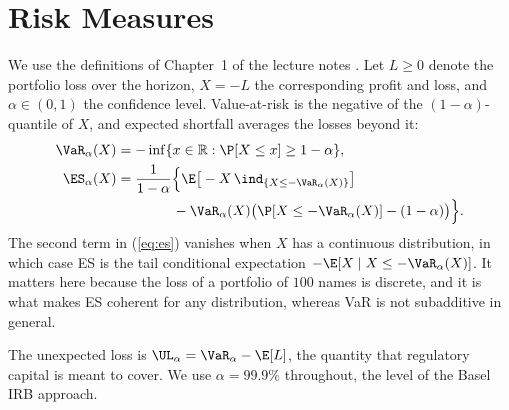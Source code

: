 \section{Risk Measures}
\label{sec:riskmeasures}

We use the definitions of Chapter~1 of the lecture notes \citep{DeGiorgi26}. Let $L\ge0$ denote the portfolio loss over the horizon, $X=-L$ the corresponding profit and loss, and $\alpha\in(0,1)$ the confidence level. Value-at-risk is the negative of the $(1-\alpha)$-quantile of $X$, and expected shortfall averages the losses beyond it:
\begin{align}
\VaR_\alpha(X)&=-\inf\{x\in\mathbb{R}:\P[X\le x]\ge 1-\alpha\},\label{eq:var}\\
\ES_\alpha(X)&=\frac{1}{1-\alpha}\Big\{\E\big[-X\,\ind_{\{X\le-\VaR_\alpha(X)\}}\big]\notag\\
&\qquad\qquad-\VaR_\alpha(X)\big(\P[X\le-\VaR_\alpha(X)]-(1-\alpha)\big)\Big\}.\label{eq:es}
\end{align}
The second term in (\ref{eq:es}) vanishes when $X$ has a continuous distribution, in which case ES is the tail conditional expectation $-\E[X\mid X\le-\VaR_\alpha(X)]$. It matters here because the loss of a portfolio of $100$ names is discrete, and it is what makes ES coherent for any distribution, whereas VaR is not subadditive in general.

The unexpected loss is $\UL_\alpha=\VaR_\alpha-\E[L]$, the quantity that regulatory capital is meant to cover. We use $\alpha=99.9\%$ throughout, the level of the Basel IRB approach.
